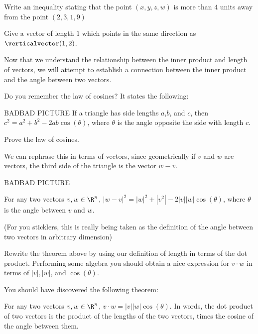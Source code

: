 \begin{question}
	Write an inequality stating that the point $(x,y,z,w)$ is more than $4$ units away from the point $(2,3,1,9)$
\end{question}

\begin{question}
	Give a vector of length $1$ which points in the same direction as $\verticalvector(1,2)$.
\end{question}

Now that we understand the relationship between the inner product and length of vectors, we will attempt to establish a connection between the inner product and the 
angle between two vectors.

Do you remember the law of cosines?  It states the following:

\begin{theorem}
	BADBAD PICTURE
	If a triangle has side lengths $a$,$b$, and $c$, then $c^2 = a^2+b^2 - 2ab\cos(\theta)$, where $\theta$ is the angle opposite the side with length $c$.
\end{theorem}

\begin{question}
Prove the law of cosines.
\end{question}

We can rephrase this in terms of vectors, since geometrically if $v$ and $w$ are vectors, the third side of the triangle is the vector $w-v$.

BADBAD PICTURE

\begin{theorem}
	For any two vectors $v,w \in \R^n$, $|w-v|^2 = |w|^2 +|v^2| - 2|v| |w| \cos(\theta) $, where $\theta$ is the angle between $v$ and $w$.
\end{theorem}

(For you sticklers, this is really being taken as the definition of the angle between two vectors in arbitrary dimension)

\begin{question}
	Rewrite the theorem above by using our definition of length in terms of the dot product.  Performing some algebra you should obtain a nice expression for $v\cdot w$
	in terms of $|v|, |w|$, and $\cos(\theta)$.
 \end{question}
 
 You should have discovered the following theorem:
 
 \begin{theorem}
 	For any two vectors $v,w \in \R^n$,  $v \cdot w = |v||w|\cos(\theta)$.  In words, the dot product of two vectors is the product of the lengths of the two vectors,
 	times the cosine of the angle between them.
 \end{theorem}
 
